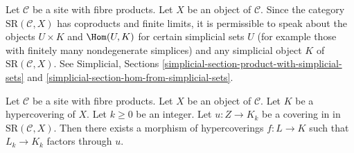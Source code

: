 \noindent
Let $\mathcal{C}$ be a site with fibre products.
Let $X$ be an object of $\mathcal{C}$.
Since the category $\text{SR}(\mathcal{C}, X)$ has coproducts and
finite limits, it is permissible to speak about the objects
$U \times K$ and $\Hom(U, K)$ for certain simplicial sets $U$
(for example those with finitely many nondegenerate simplices)
and any simplicial object $K$ of $\text{SR}(\mathcal{C}, X)$.
See Simplicial, Sections
\ref{simplicial-section-product-with-simplicial-sets} and
\ref{simplicial-section-hom-from-simplicial-sets}.

\begin{lemma}
\label{lemma-covering}
Let $\mathcal{C}$ be a site with fibre products.
Let $X$ be an object of $\mathcal{C}$.
Let $K$ be a hypercovering of $X$.
Let $k \geq 0$ be an integer.
Let $u : Z \to K_k$ be a covering in
in $\text{SR}(\mathcal{C}, X)$.
Then there exists a morphism of hypercoverings
$f: L \to K$ such that $L_k \to K_k$
factors through $u$.
\end{lemma}

